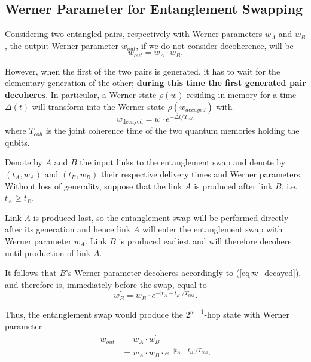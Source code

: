 \documentclass{masterthesis}
\begin{document}
\subsection*{Werner Parameter for Entanglement Swapping}

Considering two entangled pairs, respectively with Werner parameters $w_A$ and $w_B$, the output Werner parameter $w_{out}$, if we do not consider decoherence, will be %
\begin{equation}
    w_{out} = w_A \cdot w_B .
\end{equation}

However, when the first of the two pairs is generated, it has to wait for the elementary generation of the other; \textbf{during this time the first generated pair decoheres}. In particular, a Werner state $\rho(w)$ residing in memory for a time $\Delta(t)$ will transform into the Werner state $\rho(w_{decayed})$ with 
\begin{equation}\label{eq:w_decayed}
    w_{\text{decayed}} = w \cdot e^{-\Delta t / T_{coh}}
\end{equation}
where $T_{coh}$ is the joint coherence time of the two quantum memories holding the qubits. %

Denote by $A$ and $B$ the input links to the entanglement swap and denote by $\left(t_{A}, w_{A}\right)$ and $\left(t_{B}, w_{B}\right)$ their respective delivery times and Werner parameters. 
Without loss of generality, suppose that the link $A$ is produced after link $B$, i.e. $t_{A} \geq t_{B}$. 

Link $A$ is produced last, so the entanglement swap will be performed directly after its generation and hence link $A$ will enter the entanglement swap with Werner parameter $w_{A}$. Link $B$ is produced earliest and will therefore decohere until production of link $A$.

It follows that $B$'s Werner parameter decoheres accordingly to (\ref{eq:w_decayed}), and therefore is, immediately before the swap, equal to
\begin{equation*}
    w_{B}^{\prime} = w_{B} \cdot e^{-\left|t_{A}-t_{B}\right| / T_{coh}} .
\end{equation*}

Thus, the entanglement swap would produce the $2^{n+1}$-hop state with Werner parameter
\begin{align}
w_{out} &= w_{A} \cdot w_{B}^{\prime} \nonumber \\
        &= w_{A} \cdot w_{B} \cdot e^{-\left|t_{A}-t_{B}\right| / T_{coh}} .
\end{align}
\end{document}
